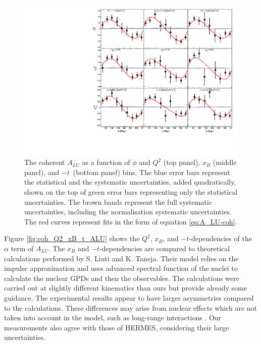\begin{figure}[tpb]
\centering
\includegraphics[scale=0.9]{fig_Dec2016/Coherent_ALU_phi.pdf}
\caption{The coherent $A_{LU}$ as a function of $\phi$ and $Q^2$ (top panel), 
   $x_{B}$ (middle panel), and $-t$~(bottom panel) bins. The blue error bars 
   represent the statistical and the systematic uncertainties, added 
   quadratically, shown on the top of green error bars representing only the 
statistical uncertainties.  The brown bands represent the full systematic 
uncertainties, including the normalisation systematic uncertainties. The red 
curves represent fits in the form of equation \ref{eq:A_LU-coh}.}
\label{fig:bsa_coh_Q2_bins}
\end{figure}

Figure \ref{fig:coh_Q2_xB_t_ALU} shows the $Q^2$, $x_{B}$, and 
$-t$-dependencies of the $\alpha$ term of $A_{LU}$. The $x_{B}$ and 
$-t$-dependencies are compared to theoretical calculations performed by S.  
Liuti and K. Taneja. Their model relies on the impulse approximation and uses 
advanced spectral function of the nuclei to calculate the nuclear GPDs and then 
the observables. The calculations were carried out at slightly different 
kinematics than ours but provide already some guidance. The experimental 
results appear to have larger asymmetries compared to the calculations. These 
differences may arise from nuclear effects which are not taken into account in 
the model, such as long-range interactions \cite{simonetta_2}. Our measurements 
also agree with those of HERMES, considering their large uncertainties. 


